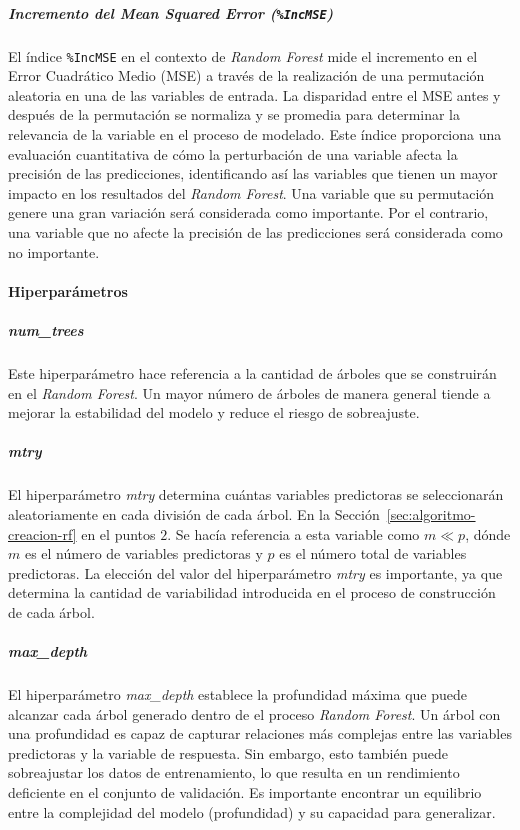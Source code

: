 \subparagraph{Incremento del Mean Squared Error (\texttt{\%IncMSE})}

El índice \texttt{\%IncMSE} en el contexto de \textit{Random Forest} mide el incremento en el Error Cuadrático Medio (MSE) a través de la realización de una permutación aleatoria en una de las variables de entrada. La disparidad entre el MSE antes y después de la permutación se normaliza y se promedia para determinar la relevancia de la variable en el proceso de modelado. Este índice proporciona una evaluación cuantitativa de cómo la perturbación de una variable afecta la precisión de las predicciones, identificando así las variables que tienen un mayor impacto en los resultados del \textit{Random Forest}. Una variable que su permutación genere una gran variación será considerada como importante. Por el contrario, una variable que no afecte la precisión de las predicciones será considerada como no importante.

\paragraph{Hiperparámetros}\label{sec:importancia-variables}

\subparagraph{\textit{num\_trees}}

Este hiperparámetro hace referencia a la cantidad de árboles que se construirán en el \textit{Random Forest}. Un mayor número de árboles de manera general tiende a mejorar la estabilidad del modelo y reduce el riesgo de sobreajuste.

\subparagraph{\textit{mtry}}

El hiperparámetro \textit{mtry} determina cuántas variables predictoras se seleccionarán aleatoriamente en cada división de cada árbol. En la Sección~\ref{sec:algoritmo-creacion-rf} en el puntos $2$. Se hacía referencia a esta variable como  \(m \ll p\), dónde \(m\) es el número de variables predictoras y \(p\) es el número total de variables predictoras. La elección del valor del hiperparámetro  \textit{mtry} es importante, ya que determina la cantidad de variabilidad introducida en el proceso de construcción de cada árbol. 

\subparagraph{\textit{max\_depth}}
El hiperparámetro \textit{max\_depth} establece la profundidad máxima que puede alcanzar cada árbol generado dentro de el proceso \textit{Random Forest}. Un árbol con una profundidad es capaz de capturar relaciones más complejas entre las variables predictoras y la variable de respuesta. Sin embargo, esto también puede sobreajustar los datos de entrenamiento, lo que resulta en un rendimiento deficiente en el conjunto de validación. Es importante encontrar un equilibrio entre la complejidad del modelo (profundidad) y su capacidad para generalizar.


